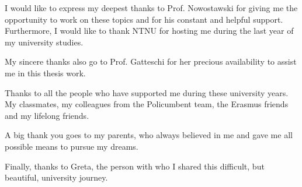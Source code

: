 I would like to express my deepest thanks to Prof. Nowostawski for giving me the opportunity to work on these topics and for his constant and helpful support. Furthermore, I would like to thank NTNU for hosting me during the last year of my university studies.

My sincere thanks also go to Prof. Gatteschi for her precious availability to assist me in this thesis work.

Thanks to all the people who have supported me during these university years. My classmates, my colleagues from the Policumbent team, the Erasmus friends and my lifelong friends. 

A big thank you goes to my parents, who always believed in me and gave me all possible means to pursue my dreams.

Finally, thanks to Greta, the person with who I shared this difficult, but beautiful, university journey.